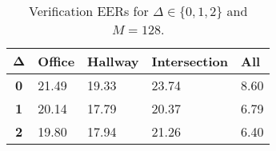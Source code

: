\begin{table}[h]
    \centering
    \begin{tabular}{|c|M{2cm}|M{2cm}|M{2cm}|M{2cm}|}
    \hline
    $\boldsymbol{\Delta}$ & \bf{Office} & \bf{Hallway} & \bf{Intersection} & \bf{All} \\ 
    \hline 
    \hline
    \bf{0} & 21.49 & 19.33 & 23.74 & 8.60 \\
    \hline
    \bf{1} & 20.14 & 17.79 & 20.37 & 6.79 \\
    \hline
    \bf{2} & 19.80 & 17.94 & 21.26 & 6.40 \\
    \hline
    \end{tabular}
    \caption{Verification EERs for $\Delta \in \{0, 1, 2\}$ and $M = 128$.}
    \label{tab:verify_speakers_M_128}
\end{table}
